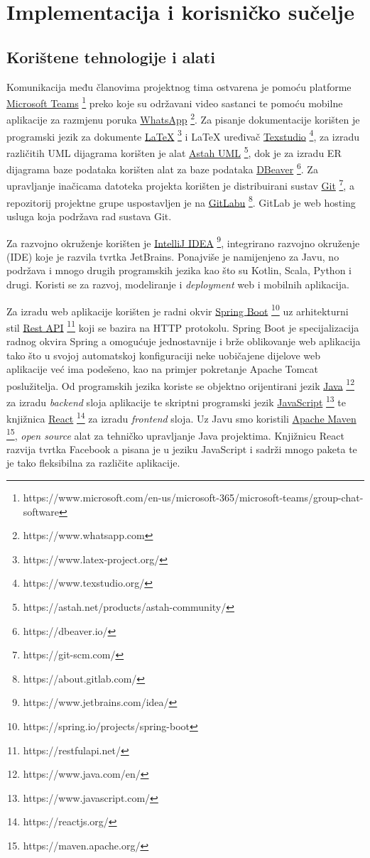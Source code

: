 \chapter{Implementacija i korisničko sučelje}
		
		
		\section{Korištene tehnologije i alati}
		
			 Komunikacija među članovima projektnog tima ostvarena je pomoću platforme  \underline{Microsoft Teams} \footnote{https://www.microsoft.com/en-us/microsoft-365/microsoft-teams/group-chat-software} preko koje su održavani video sastanci te pomoću mobilne aplikacije za razmjenu poruka \underline{WhatsApp}  \footnote{https://www.whatsapp.com}. Za pisanje dokumentacije korišten je programski jezik za dokumente \underline{LaTeX} \footnote{https://www.latex-project.org/} i LaTeX uređivač \underline{Texstudio} \footnote{https://www.texstudio.org/}, za izradu različitih UML dijagrama korišten je alat \underline{Astah UML} \footnote{https://astah.net/products/astah-community/}, dok je za izradu ER dijagrama baze podataka korišten alat za baze podataka \underline{DBeaver} \footnote{https://dbeaver.io/}. Za upravljanje inačicama datoteka projekta korišten je distribuirani sustav \underline{Git} \footnote{https://git-scm.com/}, a repozitorij projektne grupe uspostavljen je na \underline{GitLabu} \footnote{https://about.gitlab.com/}. GitLab je web hosting usluga koja podržava rad sustava Git.
			 
			 Za razvojno okruženje korišten je \underline{IntelliJ IDEA} \footnote{https://www.jetbrains.com/idea/}, integrirano razvojno okruženje (IDE) koje je razvila tvrtka JetBrains. Ponajviše je namijenjeno za Javu, no podržava i mnogo drugih programskih jezika kao što su Kotlin, Scala, Python i drugi. Koristi se za razvoj, modeliranje i \textit{deployment} web i mobilnih aplikacija. 
			 
			 Za izradu web aplikacije korišten je radni okvir \underline{Spring Boot} \footnote{https://spring.io/projects/spring-boot} uz arhitekturni stil \underline{Rest API} \footnote{https://restfulapi.net/} koji se bazira na HTTP protokolu. Spring Boot je specijalizacija radnog okvira Spring a omogućuje jednostavnije i brže oblikovanje web aplikacija tako što u svojoj automatskoj konfiguraciji neke uobičajene dijelove web aplikacije već ima podešeno, kao na primjer pokretanje Apache Tomcat poslužitelja. Od programskih jezika koriste se objektno orijentirani jezik \underline{Java} \footnote{https://www.java.com/en/} za izradu \textit{backend} sloja aplikacije te skriptni programski jezik \underline{JavaScript} \footnote{https://www.javascript.com/} te knjižnica \underline{React} \footnote{https://reactjs.org/}  za izradu \textit{frontend} sloja. Uz Javu smo koristili \underline{Apache Maven} \footnote{https://maven.apache.org/}, \textit{open source} alat za tehničko upravljanje Java projektima. Knjižnicu React razvija tvrtka Facebook a pisana je u jeziku JavaScript i sadrži mnogo paketa te je tako fleksibilna za različite aplikacije. 
			 
